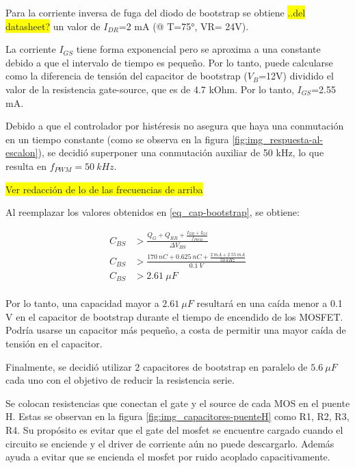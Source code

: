 \noindent Para la corriente inversa de fuga del diodo de bootstrap se obtiene \colorbox{yellow}{..del datasheet?} un valor de $I_{DR}$=2 mA (@ T=75°, VR= 24V).

\noindent La corriente $I_{GS}$ tiene forma exponencial pero se aproxima a una constante debido a que el intervalo de tiempo es pequeño. Por lo tanto, puede calcularse como la diferencia de tensión del capacitor de bootstrap ($V_B$=12V) dividido el valor de la resistencia gate-source, que es de 4.7 kOhm. Por lo tanto, $I_{GS}$=2.55 mA. 

\noindent Debido a que el controlador por histéresis no asegura que haya una conmutación en un tiempo constante (como se observa en la figura \ref{fig:img_respuesta-al-escalon}), se decidió superponer una conmutación auxiliar de 50 kHz, lo que resulta en $f_{PWM}=50 \:kHz$. 

\colorbox{yellow}{Ver redacción de lo de las frecuencias de arriba}

\noindent Al reemplazar los valores obtenidos en \ref{eq_cap-bootstrap}, se obtiene:

\begin{equation*} 
	\begin{aligned}
		C_{BS} &> \frac{Q_G+Q_{RR} + \frac{I_{DR}+I_{GS}}{f_{PWM}}}{\Delta V_{BS}}\\	
		 C_{BS} &> \frac{170 \:nC + 0.625\:nC + \frac{2 \:mA + 2.55 \:mA}{50 \:kHz}}{0.1 \:V}\\
		 C_{BS} &> 2.61 \:\mu F\\	
	\end{aligned}
\end{equation*}


\noindent Por lo tanto, una capacidad mayor a $2.61 \:\mu F$ resultará en una caída menor a 0.1 V en el capacitor de bootstrap durante el tiempo de encendido de los MOSFET. Podría usarse un capacitor más pequeño, a costa de permitir una mayor caída de tensión en el capacitor. 

\noindent Finalmente, se decidió utilizar 2 capacitores de bootstrap en paralelo de $5.6 \:\mu F$ cada uno con el objetivo de reducir la resistencia serie.



\noindent Se colocan resistencias que conectan el gate y el source de cada MOS en el puente H. Estas se observan en la figura \ref{fig:img_capacitores-puenteH} como R1, R2, R3, R4. Su propósito es evitar que el gate del mosfet se encuentre cargado cuando el circuito se enciende y el driver de corriente aún no puede descargarlo. Además ayuda a evitar que se encienda el mosfet por ruido acoplado capacitivamente. 

